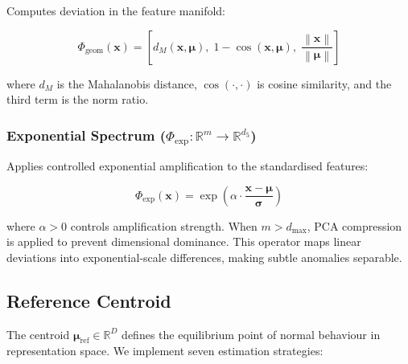 \documentclass[journal]{IEEEtran}
\newcommand{\R}{\mathbb{R}}
\newcommand{\norm}[1]{\left\lVert#1\right\rVert}
\begin{document}
Computes deviation in the feature manifold:

\begin{equation}
\Phi_{\text{geom}}(\mathbf{x}) = \left[d_M(\mathbf{x}, \boldsymbol{\mu}),\; 1 - \cos(\mathbf{x}, \boldsymbol{\mu}),\; \frac{\norm{\mathbf{x}}}{\norm{\boldsymbol{\mu}}}\right]
\label{eq:phi_geom}
\end{equation}

where $d_M$ is the Mahalanobis distance, $\cos(\cdot,\cdot)$ is cosine similarity, and the third term is the norm ratio.

\subsubsection{Exponential Spectrum ($\Phi_{\text{exp}}: \R^m \to \R^{d_5}$)}

Applies controlled exponential amplification to the standardised features:

\begin{equation}
\Phi_{\text{exp}}(\mathbf{x}) = \exp\!\left(\alpha \cdot \frac{\mathbf{x} - \boldsymbol{\mu}}{\boldsymbol{\sigma}}\right)
\label{eq:phi_exp}
\end{equation}

where $\alpha > 0$ controls amplification strength. When $m > d_{\max}$, PCA compression is applied to prevent dimensional dominance. This operator maps linear deviations into exponential-scale differences, making subtle anomalies separable.

\subsection{Reference Centroid}
\label{ssec:centroid}

The centroid $\boldsymbol{\mu}_{\text{ref}} \in \R^D$ defines the equilibrium point of normal behaviour in representation space. We implement seven estimation strategies:
\end{document}
